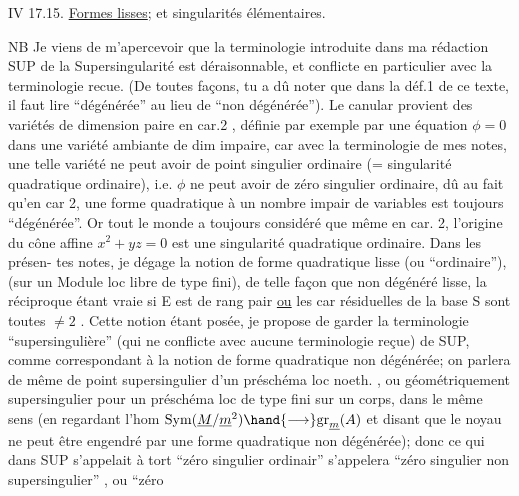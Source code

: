  

IV 17.15. \uline{Formes lisses};  et singularités élémentaires. 

NB Je viens de m'apercevoir que la terminologie introduite dans
ma rédaction SUP de la Supersingularité est déraisonnable, et conflicte
en particulier avec la terminologie recue. (De toutes façons, tu a\unsure{} dû
noter que dans la déf.1 de ce texte, il faut lire ``dégénérée'' au lieu de
``non dégénérée''). Le canular provient des variétés de dimension paire
en car.2 ,  définie par exemple par une équation $\phi=0$
dans une variété ambiante de dim impaire, car avec la terminologie de mes
notes, une telle variété ne peut avoir de  point singulier
ordinaire (= singularité quadratique ordinaire), i.e. $\phi$ ne peut avoir
de zéro singulier ordinaire, dû au fait qu'en car 2, une forme quadratique
à un nombre impair de variables est toujours ``dégénérée''. Or tout le
monde a toujours considéré que même en car. 2, l'origine du cône affine
$x^2 + yz = 0$ est une singularité quadratique ordinaire. Dans les présen-%
tes notes, je dégage la notion de forme quadratique lisse (ou ``ordinaire''),
(sur un Module loc libre de type fini), de telle façon que
non dégénéré \hand{$\Longrightarrow$} lisse, la réciproque étant vraie si E est de rang pair
\uline{ou} les car résiduelles de la base S sont toutes $\neq 2$ . Cette notion étant
posée, je propose de garder la terminologie ``supersingulière'' (qui ne
conflicte avec aucune terminologie reçue)  de SUP,
comme correspondant à la notion de forme quadratique non dégénérée; on
parlera de même de point supersingulier d'un préschéma loc noeth. , ou
géométriquement supersingulier pour un préschéma loc de type fini sur un
corps, dans le même sens (en regardant l'hom $\mathrm{Sym}(\underline{M}/\underline{m}^2) \hand{\longrightarrow} \mathrm{gr}_{\underline{m}}(A)$ et
 disant que le noyau ne peut être engendré par une forme quadratique
non dégénérée); donc ce qui dans SUP s'appelait à tort ``zéro singulier
ordinair'' s'appelera ``zéro singulier non supersingulier'' , ou ``zéro

